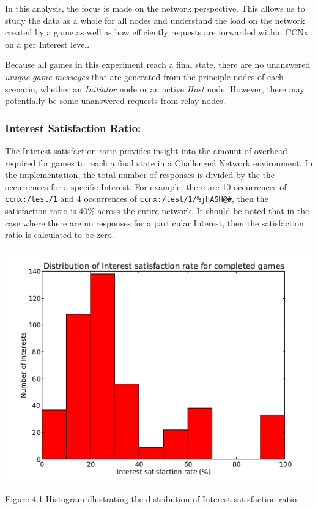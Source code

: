 \documentclass[a4paper,12pt]{report}      %
\begin{document}
\begin{descripton}
In this analysis, the focus is made on the network perspective. This allows us to study the data as a
whole for all nodes and understand the load on the network created by a game as well as how efficiently
requests are forwarded within CCNx on a per Interest level.

Because all games in this experiment reach a final state, there are no unanswered \textsl{unique game messages} that are generated
from the principle nodes of each scenario, whether an \emph{Initiator} node or an active \emph{Host} node. However,
there may potentially be some unanswered requests from relay nodes.

\subsubsection{Interest Satisfaction Ratio:}

The Interest satisfaction ratio provides insight into the amount of overhead required for games to reach a final state in a Challenged Network environment. In the implementation, the total number of responses is divided by the the occurrences for a specific Interest. For example; there are 10 occurrences of \verb!ccnx:/test/1! and 4 occurrences of \verb!ccnx:/test/1/%jhASH@#!, then the satisfaction ratio is 40\% across the entire network. It should be noted that in the case where there are no responses for a particular Interest, then the satisfaction ratio is calculated to be zero. 

\includegraphics[scale=0.73]{InterestSatisfactionRateHist.jpg}

\begin{center}Figure 4.1 Histogram illustrating the distribution of Interest satisfaction ratio\end{center}


\end{descripton}
\end{document}
